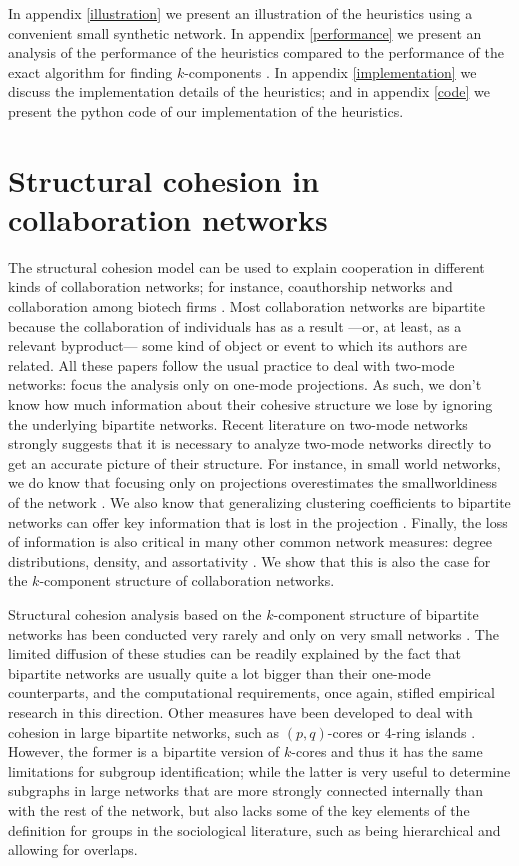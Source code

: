 In appendix \ref{illustration} we present an illustration of the heuristics using a convenient small synthetic network. In appendix \ref{performance} we present an analysis of the performance of the heuristics compared to the performance of the exact algorithm for finding $k$-components \citep{moody:2003}. In appendix \ref{implementation} we discuss the implementation details of the heuristics; and in appendix \ref{code} we present the python code of our implementation of   the heuristics.

\section{Structural cohesion in collaboration networks}

The structural cohesion model can be used to explain cooperation in different kinds of collaboration networks; for instance, coauthorship networks \citep{moody:2004, white:2004} and collaboration among biotech firms \citep{powell:2005}. Most collaboration networks are bipartite because the collaboration of individuals has as a result ---or, at least, as a relevant byproduct--- some kind of object or event to which its authors are related. All these papers follow the usual practice to deal with two-mode networks: focus the analysis only on one-mode projections. As such, we don't know how much information about their cohesive structure we lose by ignoring the underlying bipartite networks. Recent literature on two-mode networks strongly suggests that it is necessary to analyze two-mode networks directly to get an accurate picture of their structure. For instance, in small world networks, we do know that focusing only on projections overestimates the smallworldiness of the network \citep{uzzi:2007}.  We also know that generalizing clustering coefficients to bipartite networks can offer key information that is lost in the projection  \citep{robins:2004,lind:2005,opsahl:2011}.  Finally,  the loss of information is also critical in many other common network measures: degree distributions, density, and assortativity \citep{latapy:2008}. We show that this is also the case for the $k$-component structure of collaboration networks.

Structural cohesion analysis based on the $k$-component structure of bipartite networks has been conducted very rarely and only on very small networks \citep{white:2004}. The limited diffusion of these studies can be readily explained by the fact that bipartite networks are usually quite a lot bigger than their one-mode counterparts, and the computational requirements, once again, stifled empirical research in this direction. Other measures have been developed to deal with cohesion in large bipartite networks, such as $(p, q)$-cores or 4-ring islands \citep{ahmed:2007}. However, the former is a bipartite version of $k$-cores and thus it has the same limitations for subgroup identification; while the latter is very useful to determine subgraphs in large networks that are more strongly connected internally than with the rest of the network, but also lacks some of the key elements of the definition for groups in the sociological literature, such as being hierarchical and allowing for overlaps.

